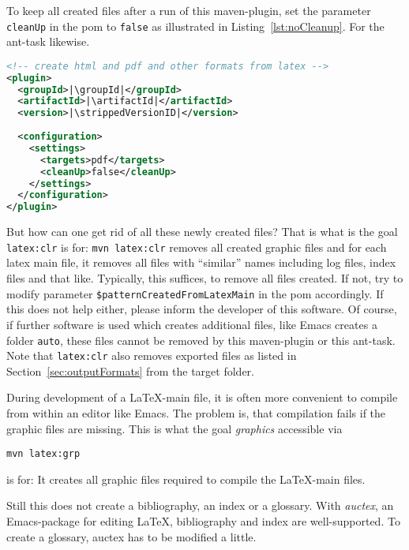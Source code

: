 To keep all created files after a run of this maven-plugin, 
set the parameter \texttt{cleanUp} in the pom 
to \texttt{false} as illustrated in Listing~\ref{lst:noCleanup}. 
For the ant-task likewise. 

\begin{lstlisting}[language=xml, basicstyle=\small,
escapechar=|,
float=b, captionpos=b, label={lst:noCleanup},
caption={Configuration without cleanup}]
<!-- create html and pdf and other formats from latex -->
<plugin>
  <groupId>|\groupId|</groupId>
  <artifactId>|\artifactId|</artifactId>
  <version>|\strippedVersionID|</version>
	
  <configuration>
    <settings>
      <targets>pdf</targets>
      <cleanUp>false</cleanUp>
    </settings>
  </configuration>
</plugin>
\end{lstlisting}


But how can one get rid of all these newly created files? 
That is what is the goal \texttt{latex:clr} is for: 
% 
\texttt{mvn latex:clr}
%
removes all created graphic files 
and for each latex main file, it removes all files with ``similar'' names
including log files, index files and that like.
Typically, this suffices, to remove all files created. 
If not, 
try to modify parameter \texttt{\$patternCreatedFromLatexMain} 
in the pom accordingly. 
If this does not help either, please inform the developer of this software. 
Of course, if further software is used which creates additional files, 
like Emacs creates a folder \texttt{auto}, 
these files cannot be removed by this maven-plugin or this ant-task.
Note that \texttt{latex:clr}
also removes exported files as listed in Section~\ref{sec:outputFormats}
from the target folder. 

During development of a \LaTeX-main file, 
it is often more convenient to compile from within an editor like Emacs. 
The problem is, that compilation fails if the graphic files are missing. 
This is what the goal \emph{graphics} accessible via 
% 
\begin{Verbatim}
mvn latex:grp
\end{Verbatim}
%
is for: 
It creates all graphic files required to compile the \LaTeX-main files. 

Still this does not create a bibliography, an index or a glossary. 
With \emph{auctex}, an Emacs-package for editing \LaTeX, 
bibliography and index are well-supported. 
To create a glossary, auctex has to be modified a little. 

